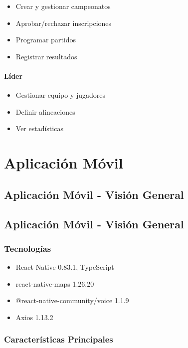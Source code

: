 \documentclass[
  spanish,
  11pt,
  letterpaper,
]{book}
\providecommand{\tightlist}{%
  \setlength{\itemsep}{0pt}\setlength{\parskip}{0pt}}
\begin{document}
\begin{itemize}
\tightlist
\item
  Crear y gestionar campeonatos
\item
  Aprobar/rechazar inscripciones
\item
  Programar partidos
\item
  Registrar resultados
\end{itemize}

\subsection{Líder}\label{luxedder}

\begin{itemize}
\tightlist
\item
  Gestionar equipo y jugadores
\item
  Definir alineaciones
\item
  Ver estadísticas
\end{itemize}

\part{Aplicación Móvil}

\chapter{Aplicación Móvil - Visión
General}\label{aplicaciuxf3n-muxf3vil---visiuxf3n-general}

\chapter{Aplicación Móvil - Visión
General}\label{aplicaciuxf3n-muxf3vil---visiuxf3n-general-1}

\section{Tecnologías}\label{tecnologuxedas-2}

\begin{itemize}
\tightlist
\item
  React Native 0.83.1, TypeScript
\item
  react-native-maps 1.26.20
\item
  @react-native-community/voice 1.1.9
\item
  Axios 1.13.2
\end{itemize}

\section{Características
Principales}\label{caracteruxedsticas-principales-1}
\end{document}
